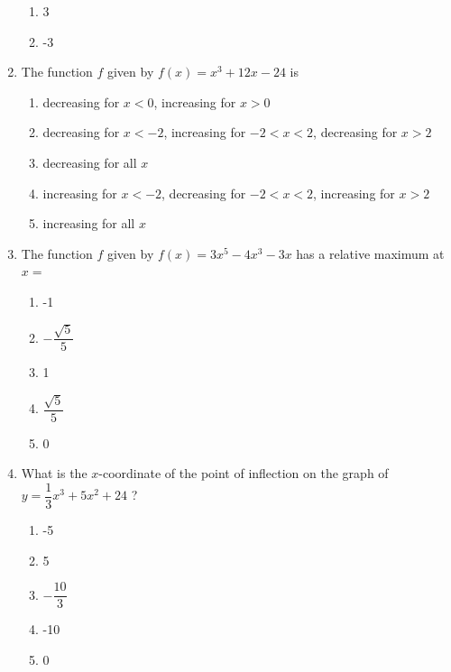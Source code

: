\documentclass{article}
\begin{document}
\begin{enumerate}
\begin{minipage}[t]{\linewidth}
\begin{enumerate}
			\item 3
			\item -3
		\end{enumerate}
	\end{minipage}
	\item
	\begin{minipage}[t]{\linewidth}
		The function \(f\) given by \(f(x)=x^{3}+12 x-24\) is
\vspace{1em}
		\begin{enumerate}
		\itemsep1em
			\item decreasing for \({x}<0\), increasing for \({x}>0\)
			\item decreasing for \({x}<-2\), increasing for \(-2<{x}<2\), decreasing for
\({x}>2\)
			\item decreasing for all \(x\)
			\item increasing for \(x<-2\), decreasing for \(-2<x<2\), increasing for
\(x>2\)
			\item increasing for all \(x\)
		\end{enumerate}
	\end{minipage}
	\item
	\begin{minipage}[t]{\linewidth}
		The function \(f\) given by \(f(x)=3 x^{5}-4 x^{3}-3 x\) has a relative
maximum at \(x=\)
\vspace{1em}
		\begin{enumerate}
		\itemsep1em
			\item -1
			\item \(-\dfrac{\sqrt{5}}{5}\)
			\item 1
			\item \(\dfrac{\sqrt{5}}{5}\)
			\item 0
		\end{enumerate}
	\end{minipage}
	\item
	\begin{minipage}[t]{\linewidth}
		What is the \(x\)-coordinate of the point of inflection on the graph of
\(y=\dfrac{1}{3} x^{3}+5 x^{2}+24\) ?
\vspace{1em}
		\begin{enumerate}
		\itemsep1em
			\item -5
			\item 5
			\item \(-\dfrac{10}{3}\)
			\item -10
			\item 0
		\end{enumerate}
	\end{minipage}

\end{enumerate}
\end{document}
